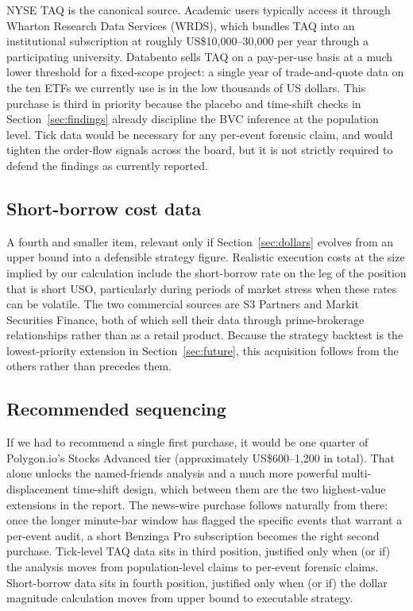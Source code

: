 \documentclass[11pt,a4paper]{article}
\begin{document}
NYSE TAQ is the canonical source. Academic users typically access it through Wharton Research Data Services (WRDS), which bundles TAQ into an institutional subscription at roughly US\$10{,}000--30{,}000 per year through a participating university. Databento sells TAQ on a pay-per-use basis at a much lower threshold for a fixed-scope project: a single year of trade-and-quote data on the ten ETFs we currently use is in the low thousands of US dollars. This purchase is third in priority because the placebo and time-shift checks in Section~\ref{sec:findings} already discipline the BVC inference at the population level. Tick data would be necessary for any per-event forensic claim, and would tighten the order-flow signals across the board, but it is not strictly required to defend the findings as currently reported.

\subsection{Short-borrow cost data}

A fourth and smaller item, relevant only if Section~\ref{sec:dollars} evolves from an upper bound into a defensible strategy figure. Realistic execution costs at the size implied by our calculation include the short-borrow rate on the leg of the position that is short USO, particularly during periods of market stress when these rates can be volatile. The two commercial sources are S3 Partners and Markit Securities Finance, both of which sell their data through prime-brokerage relationships rather than as a retail product. Because the strategy backtest is the lowest-priority extension in Section~\ref{sec:future}, this acquisition follows from the others rather than precedes them.

\subsection{Recommended sequencing}

If we had to recommend a single first purchase, it would be one quarter of Polygon.io's Stocks Advanced tier (approximately US\$600--1{,}200 in total). That alone unlocks the named-friends analysis and a much more powerful multi-displacement time-shift design, which between them are the two highest-value extensions in the report. The news-wire purchase follows naturally from there: once the longer minute-bar window has flagged the specific events that warrant a per-event audit, a short Benzinga Pro subscription becomes the right second purchase. Tick-level TAQ data sits in third position, justified only when (or if) the analysis moves from population-level claims to per-event forensic claims. Short-borrow data sits in fourth position, justified only when (or if) the dollar magnitude calculation moves from upper bound to executable strategy.
\end{document}
